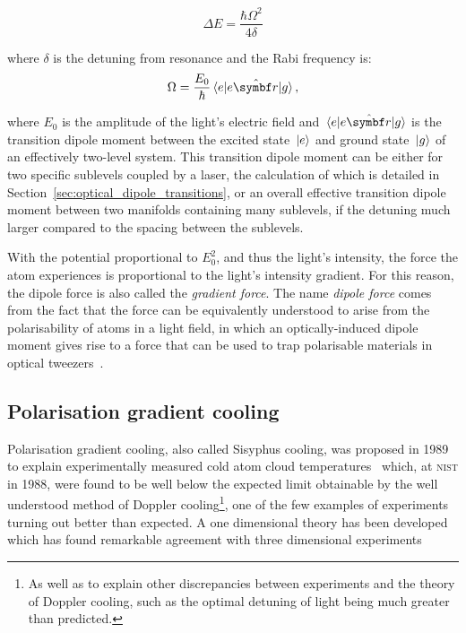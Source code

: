 \begin{equation}
\Delta E = \frac{\hbar\Omega^2}{4\delta}
\end{equation}

where $\delta$ is the detuning from resonance and the Rabi frequency is:
\begin{equation}
\Omega=\frac{E_0}\hbar\matrixel{e}{e\hat{\vec r}}{g},
\end{equation}

where $E_0$ is the amplitude of the light's electric field and  $\matrixel{e}{e\hat{\vec r}}{g}$ is the transition dipole moment between the excited state $\ket{e}$ and ground state $\ket{g}$ of an effectively two-level system. This transition dipole moment can be either for two specific sublevels coupled by a laser, the calculation of which is detailed in Section~\ref{sec:optical_dipole_transitions}, or an overall effective transition dipole moment between two manifolds containing many sublevels, if the detuning much larger compared to the spacing between the sublevels.

With the potential proportional to $E_0^2$, and thus the light's intensity, the force the atom experiences is proportional to the light's intensity gradient. For this reason, the dipole force is also called the \emph{gradient force}. The name \emph{dipole force} comes from the fact that the force can be equivalently understood to arise from the polarisability of atoms in a light field, in which an optically-induced dipole moment gives rise to a force that can be used to trap polarisable materials in optical tweezers~\cite{ashkin_acceleration_1970}.

\subsection{Polarisation gradient cooling}

Polarisation gradient cooling, also called Sisyphus cooling, was proposed in 1989~\cite{dalibard_laser_1989, ungar_optical_1989} to explain experimentally measured cold atom cloud temperatures~\cite{lett_optical_1989} which, at \textsc{nist} in 1988, were found to be well below the expected limit obtainable by the well understood method of Doppler cooling\footnote{As well as to explain other discrepancies between experiments and the theory of Doppler cooling, such as the optimal detuning of light being much greater than predicted.}, one of the few examples of experiments turning out better than expected. A one dimensional theory has been developed~\cite{dalibard_laser_1989} which has found remarkable agreement with three dimensional experiments~\cite{salomon_laser_1990}

